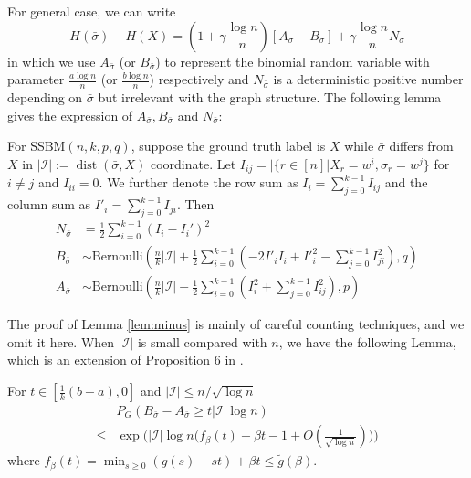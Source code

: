 \documentclass[entropy,article,submit,moreauthors,pdftex]{Definitions/mdpi}
\newcommand{\A}{\frac{a \log n}{n}}
\newcommand{\B}{\frac{b \log n}{n}}
\newcommand{\cI}{\mathcal{I}}
\newcommand{\1}{\mathbbm{1}}
\DeclareMathOperator{\Dist}{dist}
\begin{document}
For general case, we can write
\begin{equation}\label{eq:Hgeneral}
H(\bar{\sigma}) - H(X)=
(1 + \gamma \frac{ \log n}{n})[A_{\bar{\sigma}} - B_{\bar{\sigma}}] + \gamma\frac{ \log n}{n} N_{\bar{\sigma}}
\end{equation}
in which we use $A_{\bar{\sigma}}$ (or $B_{\bar{\sigma}}$) to represent the binomial random variable with parameter $\A$ (or $\B$)
respectively and $N_{\bar{\sigma}}$ is a deterministic positive number depending on $\bar{\sigma}$ but irrelevant with the graph structure.
The following lemma gives the expression of $A_{\bar{\sigma}}, B_{\bar{\sigma}}$ and $N_{\bar{\sigma}}$:
\begin{Lemma}\label{lem:minus}
	For SSBM$(n,k,p,q)$, suppose the ground truth label is $X$ while $\bar{\sigma}$ differs from $X$ in $|\cI|:=\Dist(\bar{\sigma}, X)$ coordinate.
	Let $I_{ij} = |\{r\in [n] | X_r = w^i, \sigma_r = w^j \}$ for $i\neq j$ and $I_{ii} = 0$. We further denote the row sum as $I_i = \sum_{j=0}^{k-1} I_{ij}$ and
	the column sum as $I'_i = \sum_{j=0}^{k-1} I_{ji}$.
	Then
	\begin{align}
	N_{\bar{\sigma}} &= \frac{1}{2}\sum_{i=0}^{k-1} (I_i - I_i')^2 \label{eq:N_w} \\
	B_{\bar{\sigma}} & \sim \textrm{Bernoulli}(\frac{n}{k}|\cI| + \frac{1}{2}\sum_{i=0}^{k-1}  (-2 I'_i I_i  + I'^2_i - \sum_{j=0}^{k-1} I^2_{ji}) , q)\\
	A_{\bar{\sigma}} & \sim \textrm{Bernoulli}(\frac{n}{k}|\cI| - \frac{1}{2}\sum_{i=0}^{k-1}  (I^2_i + \sum_{j=0}^{k-1} I^2_{ij}), p) \label{eq:A_w}
	\end{align}
\end{Lemma}
The proof of Lemma \ref{lem:minus} is mainly of careful counting techniques, and we omit it here.
When $|\cI|$ is small compared with $n$, we have the following Lemma, which is an extension of Proposition 6 in \cite{ye2020exact}. 
\begin{Lemma}\label{lem:enhanced_fb}
	For $t\in [\frac{1}{k}(b-a), 0]$
	and $ |\cI| \le n/\sqrt{\log n}$
	\begin{equation} \label{eq:upmpt}
	\begin{aligned}
	& P_G(B_{\bar{\sigma}}-A_{\bar{\sigma}}\ge t |\cI| \log n)  \\
	\le & \exp\Big(|\cI|\log n
	\Big(f_{\beta}(t) - \beta t -1	+ O(\frac{1}{\sqrt{\log n}}) \Big)\Big)
	\end{aligned}
	\end{equation}
	where $f_{\beta}(t) = \min_{s\geq 0} (g(s) - st) + \beta t \leq \tilde{g}(\beta) $.
\end{Lemma}
\end{document}

